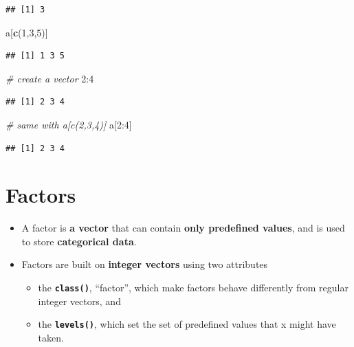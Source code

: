 \documentclass[]{book}
\newenvironment{Shaded}{\begin{snugshade}}{\end{snugshade}}
\newcommand{\KeywordTok}[1]{\textcolor[rgb]{0.13,0.29,0.53}{\textbf{{#1}}}}
\newcommand{\DecValTok}[1]{\textcolor[rgb]{0.00,0.00,0.81}{{#1}}}
\newcommand{\CommentTok}[1]{\textcolor[rgb]{0.56,0.35,0.01}{\textit{{#1}}}}
\newcommand{\NormalTok}[1]{{#1}}
\providecommand{\tightlist}{%
  \setlength{\itemsep}{0pt}\setlength{\parskip}{0pt}}
\begin{document}
\begin{verbatim}
## [1] 3
\end{verbatim}

\begin{Shaded}
\begin{Highlighting}[]
\NormalTok{a[}\KeywordTok{c}\NormalTok{(}\DecValTok{1}\NormalTok{,}\DecValTok{3}\NormalTok{,}\DecValTok{5}\NormalTok{)]}
\end{Highlighting}
\end{Shaded}

\begin{verbatim}
## [1] 1 3 5
\end{verbatim}

\begin{Shaded}
\begin{Highlighting}[]
\CommentTok{# create a vector}
\DecValTok{2}\NormalTok{:}\DecValTok{4}
\end{Highlighting}
\end{Shaded}

\begin{verbatim}
## [1] 2 3 4
\end{verbatim}

\begin{Shaded}
\begin{Highlighting}[]
\CommentTok{# same with a[c(2,3,4)]}
\NormalTok{a[}\DecValTok{2}\NormalTok{:}\DecValTok{4}\NormalTok{]}
\end{Highlighting}
\end{Shaded}

\begin{verbatim}
## [1] 2 3 4
\end{verbatim}

\section{Factors}\label{factors}

\begin{itemize}
\tightlist
\item
  A factor is \textbf{a vector} that can contain \textbf{only predefined
  values}, and is used to store \textbf{categorical data}.
\item
  Factors are built on \textbf{integer vectors} using two attributes

  \begin{itemize}
  \tightlist
  \item
    the \textbf{\texttt{class()}}, ``factor'', which make factors behave
    differently from regular integer vectors, and
  \item
    the \textbf{\texttt{levels()}}, which set the set of predefined
    values that x might have taken.
  \end{itemize}
\end{itemize}
\end{document}
